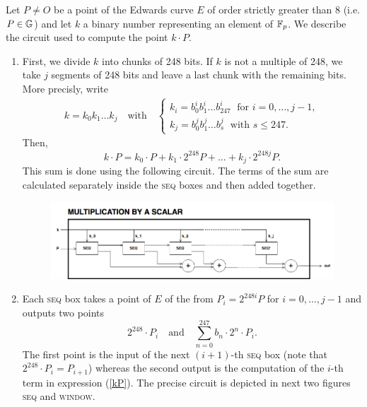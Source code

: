 Let $P\not= O$ be a point of the Edwards curve $E$ of order strictly greater than 8 (i.e. $P\in\mathbb{G}$) and let $k$ a binary number representing an element of $\mathbb{F}_p$. We describe the circuit used to compute the point $k\cdot P$.

\begin{enumerate}
	
	\item First, we divide $k$ into chunks of 248 bits. If $k$ is not a multiple of 248, we take $j$ segments of 248 bits and leave a last chunk with the remaining bits. More precisly, write 
		\begin{gather*}
		k = k_0 k_1 \dots k_j 	\quad\text{with}\quad 
			\begin{cases}
			k_i = b^i_0 b^i_1 \dots b^i_{247} 	\;\text{ for }  i = 0, \dots, j-1, \\
			k_j = b^j_0 b^j_1 \dots b^j_s 	\;\text{ with } s\leq 247.
			\end{cases}
		\end{gather*}
	Then,  
		\begin{equation}
		\label{kP}
			k\cdot P = k_0\cdot P + k_1\cdot 2^{248}P +\dots+ k_j\cdot 2^{248j}P. 	
 		\end{equation}
	This sum is done using the following circuit. 
	The terms of the sum are calculated separately inside the \textsc{seq} boxes and then added together. 

	\begin{figure}[h]
		\centering
		\includegraphics[scale=0.45]{figures/multiplication.png}
	\end{figure}
	
	\item Each \textsc{seq} box takes a point of $E$ of the from $P_i = 2^{248 i} P$ for $i=0,\dots,j-1$ and outputs two points %
		$$ 	
			2^{248} \cdot P_i 
			\quad \text{and} \quad
			\sum_{n = 0}^{247} b_n \cdot 2^{n} \cdot P_i. 
		$$
	The first point is the input of the next $(i+1)$-th \textsc{seq} box (note that $ 2^{248} \cdot P_i = P_{i+1}$) whereas the second output is the computation of the $i$-th term in expression (\ref{kP}). The precise circuit is depicted in next two figures \textsc{seq} and \textsc{window}.
	

\end{enumerate}
